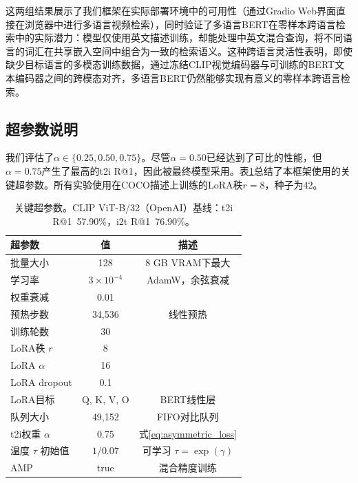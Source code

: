 \documentclass[10pt,a4paper]{ctexart}
\begin{document}
这两组结果展示了我们框架在实际部署环境中的可用性（通过Gradio Web界面直接在浏览器中进行多语言视频检索），同时验证了多语言BERT在零样本跨语言检索中的实际潜力：模型仅使用英文描述训练，却能处理中英文混合查询，将不同语言的词汇在共享嵌入空间中组合为一致的检索语义。这种跨语言灵活性表明，即使缺少目标语言的多模态训练数据，通过冻结CLIP视觉编码器与可训练的BERT文本编码器之间的跨模态对齐，多语言BERT仍然能够实现有意义的零样本跨语言检索。

\subsection*{超参数说明}

我们评估了$\alpha \in \{0.25, 0.50, 0.75\}$。尽管$\alpha{=}0.50$已经达到了可比的性能，但$\alpha{=}0.75$产生了最高的t2i R@1，因此被最终模型采用。表\ref{tab:hyperparams}总结了本框架使用的关键超参数。所有实验使用在COCO描述上训练的LoRA秩$r=8$，种子为42。

\begin{table}[htbp]
\centering
\caption{关键超参数。CLIP ViT-B/32（OpenAI）基线：t2i R@1~57.90\%，i2t R@1~76.90\%。}
\label{tab:hyperparams}
\begin{tabular}{lcc}
\toprule
超参数 & 值 & 描述 \\
\midrule
批量大小 & 128 & 8 GB VRAM下最大 \\
学习率 & $3\times10^{-4}$ & AdamW，余弦衰减 \\
权重衰减 & 0.01 & \\
预热步数 & 34,536 & 线性预热 \\
训练轮数 & 30 & \\
\midrule
LoRA秩 $r$ & 8 & \\
LoRA $\alpha$ & 16 & \\
LoRA dropout & 0.1 & \\
LoRA目标 & Q, K, V, O & BERT线性层 \\
\midrule
队列大小 & 49,152 & FIFO对比队列 \\
t2i权重 $\alpha$ & 0.75 & 式\ref{eq:asymmetric_loss} \\
温度 $\tau$ 初始值 & $1/0.07$ & 可学习 $\tau=\exp(\gamma)$ \\
\midrule
AMP & true & 混合精度训练 \\
\bottomrule
\end{tabular}
\end{table}

\bigskip
\end{document}
